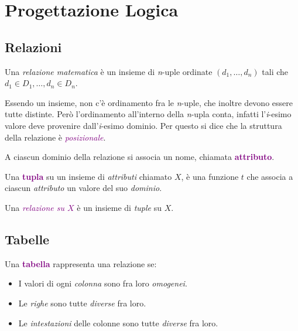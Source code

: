 \section{Progettazione Logica}

\subsection{Relazioni}

\begin{definition}
    Una \emph{relazione matematica} è un insieme di \emph{n}-uple ordinate
    $(d_1, \dots, d_n)$ tali che $d_1 \in D_1, \dots, d_n \in D_n$.

    Essendo un insieme, non c'è ordinamento fra le \emph{n}-uple, che inoltre devono essere
    tutte distinte. Però l'ordinamento all'interno della \emph{n}-upla conta, infatti l'\emph{i}-esimo
    valore deve provenire dall'\emph{i}-esimo dominio. Per questo si dice che la struttura della relazione
    è \emph{\textcolor{purple}{posizionale}}.
\end{definition}

\begin{definition}[Attributo]
    A ciascun dominio della relazione si associa un nome, chiamata \textbf{\textcolor{purple}{attributo}}.
\end{definition}

\begin{definition}[Tupla]
    Una \textbf{\textcolor{purple}{tupla}} su un insieme di \emph{attributi} chiamato $X$, è una funzione
    $t$ che associa a ciascun \emph{attributo} un valore del suo \emph{dominio}.

    Una \emph{\textcolor{purple}{relazione su $X$}} è un insieme di \emph{tuple}
    su $X$.
\end{definition}

\subsection{Tabelle}
Una \textbf{\textcolor{purple}{tabella}} rappresenta una relazione se:
\begin{itemize}
    \item I valori di ogni \emph{colonna} sono fra loro \emph{omogenei}.
    \item Le \emph{righe} sono tutte \emph{diverse} fra loro.
    \item Le \emph{intestazioni} delle colonne sono tutte \emph{diverse} fra loro.
\end{itemize}

